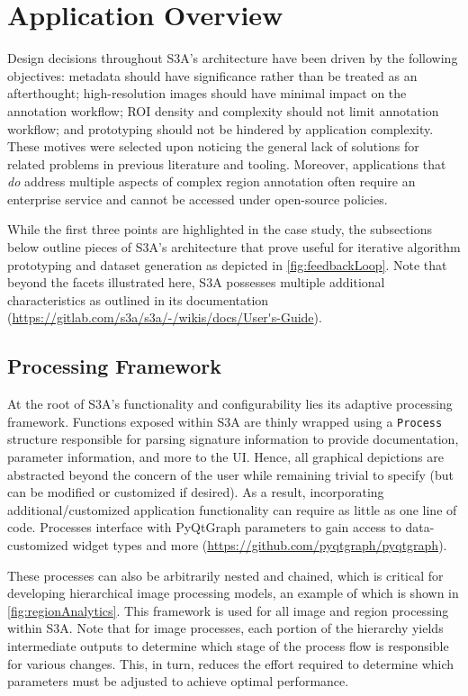 \section{Application Overview}\label{sec:appFeatures}
Design decisions throughout S3A's architecture have been driven by the following objectives: metadata should have significance rather than be treated as an afterthought; high-resolution images should have minimal impact on the annotation workflow; ROI density and complexity should not limit annotation workflow; and prototyping should not be hindered by application complexity.
These motives were selected upon noticing the general lack of solutions for related problems in previous literature and tooling. Moreover, applications that \emph{do} address multiple aspects of complex region annotation often require an enterprise service and cannot be accessed under open-source policies.

While the first three points are highlighted in the case study, the subsections below outline pieces of S3A's architecture that prove useful for iterative algorithm prototyping and dataset generation as depicted in \autoref{fig:feedbackLoop}. Note that beyond the facets illustrated here, S3A possesses multiple additional characteristics as outlined in its documentation (\url{https://gitlab.com/s3a/s3a/-/wikis/docs/User's-Guide}).

\makeFeedbackLoopFig

\subsection{Processing Framework}\label{sec:procFramework}
At the root of S3A's functionality and configurability lies its adaptive processing framework. Functions exposed within S3A are thinly wrapped using a \texttt{Process} structure responsible for parsing signature information to provide documentation, parameter information, and more to the UI. Hence, all graphical depictions are abstracted beyond the concern of the user while remaining trivial to specify (but can be modified or customized if desired). As a result, incorporating additional/customized application functionality can require as little as one line of code. Processes interface with PyQtGraph parameters to gain access to data-customized widget types and more (\url{https://github.com/pyqtgraph/pyqtgraph}).


These processes can also be arbitrarily nested and chained, which is critical for developing hierarchical image processing models, an example of which is shown in \autoref{fig:regionAnalytics}. This framework is used for all image and region processing within S3A. Note that for image processes, each portion of the hierarchy yields intermediate outputs to determine which stage of the process flow is responsible for various changes. This, in turn, reduces the effort required to determine which parameters must be adjusted to achieve optimal performance. 


